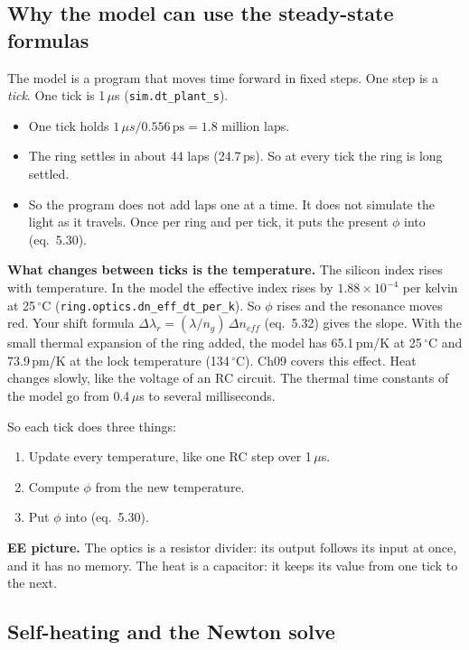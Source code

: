 \documentclass[11pt,letterpaper]{article}
\newcommand{\us}{\,\ensuremath{\mu}s}
\newcommand{\degC}{\,\ensuremath{^\circ}C}
\newcommand{\eq}[1]{(eq.~#1)}
\begin{document}
\subsection{Why the model can use the steady-state formulas}\label{sec:why}

The model is a program that moves time forward in fixed steps. One step is a \emph{tick}. One tick is 1\us{}
(\texttt{sim.dt\_plant\_s}).
\begin{itemize}
  \item One tick holds $1\us/0.556\,\mathrm{ps}=1.8$ million laps.
  \item The ring settles in about 44 laps (24.7\,ps). So at every tick the ring is long settled.
  \item So the program does not add laps one at a time. It does not simulate the light as it travels. Once per ring
  and per tick, it puts the present $\phi$ into \eq{5.30}.
\end{itemize}
\textbf{What changes between ticks is the temperature.} The silicon index rises with temperature. In the model the
effective index rises by $1.88\times10^{-4}$ per kelvin at 25\degC{} (\texttt{ring.optics.dn\_eff\_dt\_per\_k}). So $\phi$ rises and the
resonance moves red. Your shift formula $\Delta\lambda_r=(\lambda/n_g)\,\Delta n_{eff}$ \eq{5.32} gives the slope.
With the small thermal expansion of the ring added, the model has 65.1\,pm/K at 25\degC{} and 73.9\,pm/K at the lock
temperature (134\degC). Ch09 covers this effect. Heat changes slowly, like the voltage of an RC circuit. The thermal
time constants of the model go from 0.4\us{} to several milliseconds.

So each tick does three things:
\begin{enumerate}
  \item Update every temperature, like one RC step over 1\us.
  \item Compute $\phi$ from the new temperature.
  \item Put $\phi$ into \eq{5.30}.
\end{enumerate}
\textbf{EE picture.} The optics is a resistor divider: its output follows its input at once, and it has no memory.
The heat is a capacitor: it keeps its value from one tick to the next.

\subsection{Self-heating and the Newton solve}\label{sec:newton}
\end{document}
